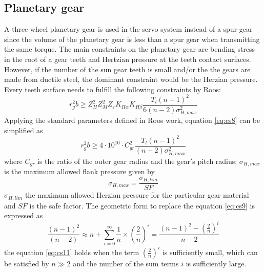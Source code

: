 \subsection*{Planetary gear}
A three wheel planetary gear is used in the servo system instead of a spur gear since the volume of the planetary gear is less than a spur gear when transmitting the same torque. The main constraints on the planetary gear are bending stress in the root of a gear teeth and Hertzian pressure at the teeth contact surfaces. However, if the number of the sun gear teeth is small and/or the the gears are made from ductile steel, the dominant constraint would be the Herzian pressure. Every teeth surface needs to fulfill the following constraints by Roos:
\begin{equation} \label{eq:cs8}
r_g^2b \geq Z_H^2Z_M^2Z_{\varepsilon}K_{H\alpha}K_{H\beta}\frac{T_l(n-1)^2}{6(n-2)\sigma_{H,max}^2}
\end{equation}
Applying the standard parameters defined in Roos work, equation \ref{eq:cs8} can be simplified as
\begin{equation} \label{eq:cs9}
r_g^2b \geq 4\cdot10^{10} \cdot C_{gr}^2\frac{T_l(n-1)^2}{(n-2)\sigma_{H,max}^2}
\end{equation}
where $C_{gr}$ is the ratio of the outer gear radius and the gear$'$s pitch radius; $\sigma_{H,max}$ is the maximum allowed flank pressure given by
\begin{equation} \label{eq:cs10}
\sigma_{H,max}=\frac{\sigma_{H,lim}}{SF}
\end{equation}
$\sigma_{H,lim}$ the maximum allowed Herzian pressure for the particular gear material and $SF$ is the safe factor.
The geometric form to replace the equation \ref{eq:cs9} is expressed as
\begin{equation} \label{eq:cs11}
\frac{(n-1)^2}{(n-2)} \approx n+\sum_{i=0}^{\infty} \frac{1}{n}\times(\frac{2}{n})^i = \frac{(n-1)^2-(\frac{2}{n})^i}{n-2}
\end{equation}
the equation \ref{eq:cs11} holds when the term $(\frac{2}{n})^i$ is sufficiently small, which can be satisfied by $n \gg 2$ and the number of the sum terms $i$ is sufficiently large. 

